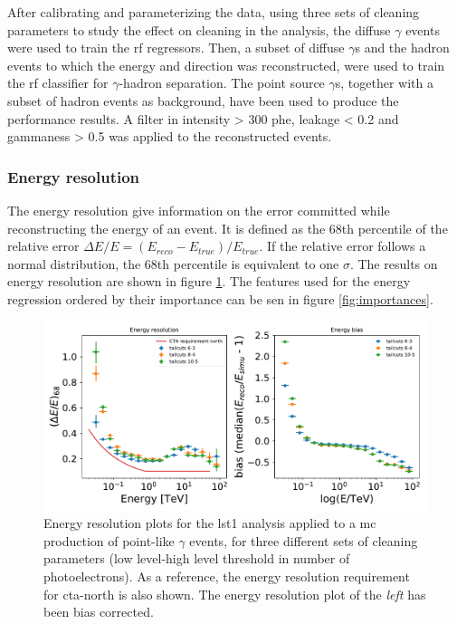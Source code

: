 \documentclass[main.tex]{subfiles}
\begin{document}
After calibrating and parameterizing the data, using three sets of cleaning parameters to study the effect on cleaning in the analysis, the diffuse $\gamma$ events were used to train the \gls{rf} regressors. Then, a subset of diffuse $\gamma$s and the hadron events to which the energy and direction was reconstructed, were used to train the \gls{rf} classifier for $\gamma$-hadron separation.
The point source $\gamma$s, together with a subset of hadron events as background, have been used to produce the performance results. A filter in intensity > 300 phe, leakage < 0.2 and gammaness > 0.5 was applied to the reconstructed events.  

\subsubsection{Energy resolution}

The energy resolution give information on the error committed while reconstructing the energy of an event. It is defined as the 68th percentile of the relative error $\Delta E/E = (E_{reco}-E_{true})/E_{true}$. If the relative error follows a normal distribution, the 68th percentile is equivalent to one $\sigma$. The results on energy resolution are shown in figure \ref{fig:energy}. The features used for the energy regression ordered by their importance can be sen in figure \ref{fig:importances}.

\begin{figure}
\centering
 \includegraphics[width=1\textwidth]{Pictures/energy_resolution.pdf}
  \caption{Energy resolution plots for the \gls{lst}1 analysis applied to a \gls{mc} production of point-like $\gamma$ events, for three different sets of cleaning parameters (low level-high level threshold in number of photoelectrons). As a reference, the energy resolution requirement for \gls{cta}-north is also shown. The energy resolution plot of the \textit{left} has been bias corrected.}
    \label{fig:energy}
\end{figure}
\end{document}
